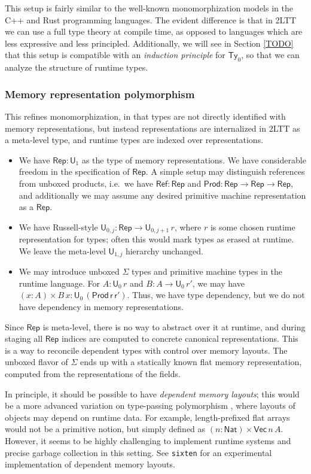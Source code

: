 \documentclass[acmsmall]{acmart}
\newcommand{\msf}[1]{\mathsf{#1}}
\renewcommand{\U}{\msf{U}}
\newcommand{\Ty}{\msf{Ty}}
\newcommand{\Nat}{\msf{Nat}}
\newcommand{\Rep}{\msf{Rep}}
\theoremstyle{remark}
\begin{document}
This setup is fairly similar to the well-known monomorphization models in the
C++ and Rust programming languages. The evident difference is that in 2LTT we
can use a full type theory at compile time, as opposed to languages which are
less expressive and less principled. Additionally, we will see in Section
\ref{TODO} that this setup is compatible with an \emph{induction principle} for
$\Ty_0$, so that we can analyze the structure of runtime types.

\subsubsection{Memory representation polymorphism}

This refines monomorphization, in that types are not directly identified with
memory representations, but instead representations are internalized in 2LTT as
a meta-level type, and runtime types are indexed over representations.
\begin{itemize}
\item We have $\Rep : \U_1$ as the type of memory representations. We have
  considerable freedom in the specification of $\Rep$. A simple setup may
  distinguish references from unboxed products, i.e.\ we have $\msf{Ref} : \Rep$
  and $\msf{Prod} : \Rep \to \Rep \to \Rep$, and additionally we may assume
  any desired primitive machine representation as a $\Rep$.
\item We have Russell-style $\U_{0,j} : \Rep \to \U_{0, j+1}\,r$, where $r$ is
  some chosen runtime representation for types; often this would mark types as
  erased at runtime. We leave the meta-level $\U_{1,j}$ hierarchy unchanged.
\item We may introduce unboxed $\Sigma$ types and primitive machine types in the
  runtime language. For $A : \U_{0}\,r$ and $B : A \to \U_{0}\,r'$, we may have
  $(x : A) \times B\,x : \U_{0}\,(\msf{Prod\,r\,r'})$. Thus, we have
  type dependency, but we do not have dependency in memory representations.
\end{itemize}
Since $\Rep$ is meta-level, there is no way to abstract over it at runtime, and
during staging all $\Rep$ indices are computed to concrete canonical
representations. This is a way to reconcile dependent types with control over
memory layouts.  The unboxed flavor of $\Sigma$ ends up with a statically known
flat memory representation, computed from the representations of the fields.

In principle, it should be possible to have \emph{dependent memory layouts};
this would be a more advanced variation on type-passing polymorphism
\cite{TODO}, where layouts of objects may depend on runtime data. For example,
length-prefixed flat arrays would not be a primitive notion, but simply defined
as $(n : \Nat) \times \msf{Vec}\,n\,A$. However, it seems to be highly
challenging to implement runtime systems and precise garbage collection in this
setting. See \texttt{sixten} \cite{TODO} for an experimental implementation of
dependent memory layouts.
\end{document}
